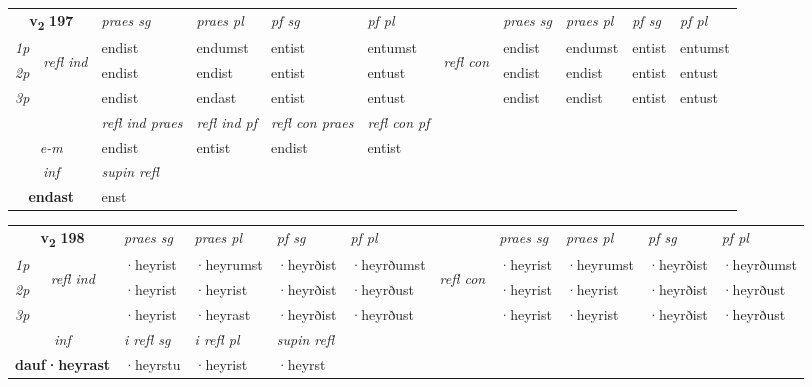 \noindent
\begin{tabular}{lllllllllll} \toprule
\multicolumn{2}{c}{\textbf{v{\textsubscript{2}}} \Large{\textbf{197}}}  &  \textit{praes sg}  & \textit{praes pl}  &\textit{ pf sg} & \textit{pf pl} &  &  \textit{praes sg}  & \textit{praes pl}  & \textit{pf sg} & \textit{pf pl } \\*
	\cmidrule{3-6} \cmidrule{8-11}
 {\textit{1p}} & \multirow{3}{*}{\begin{turn}{90}\textit{refl ind}\end{turn}}  & endist & endumst & entist & entumst & \multirow{3}{*}{\begin{turn}{90}\textit{refl con}\end{turn}}  &endist & endumst & entist & entumst \\*
 {\textit{2p}} &  & endist & endist & entist & entust & &endist & endist & entist & entust \\*
 {\textit{3p}}  & & endist & endast & entist & entust & & endist & endist& entist & entust \\*
\cmidrule{3-6} \cmidrule{8-11}

 & & \textit{refl ind praes} & \textit{refl ind pf} & \textit{refl con praes} & \textit{refl con pf} \\*
 \multicolumn{2}{c}{ \textit{e-m} }& endist & entist & endist & entist \\*

\cmidrule{3-3}
   \multicolumn{2}{c}{\textit{inf}}       & \textit{supin refl}  \\*
  \multicolumn{2}{c}{\textbf{endast}}        & enst  \\*
\end{tabular}

\noindent
\noindent
\begin{tabular}{lllllllllll} \toprule
\multicolumn{2}{c}{\textbf{v{\textsubscript{2}}} \Large{\textbf{198}}}  &  \textit{praes sg}  & \textit{praes pl}  &\textit{ pf sg} & \textit{pf pl} &  &  \textit{praes sg}  & \textit{praes pl}  & \textit{pf sg} & \textit{pf pl } \\*
	\cmidrule{3-6} \cmidrule{8-11}
 {\textit{1p}} & \multirow{3}{*}{\begin{turn}{90}\textit{refl ind}\end{turn}}  & ·heyrist & ·heyrumst & ·heyrðist & ·heyrðumst & \multirow{3}{*}{\begin{turn}{90}\textit{refl con}\end{turn}}  &·heyrist & ·heyrumst & ·heyrðist & ·heyrðumst \\*
 {\textit{2p}} &  & ·heyrist & ·heyrist & ·heyrðist & ·heyrðust & &·heyrist & ·heyrist & ·heyrðist & ·heyrðust \\*
 {\textit{3p}}  & & ·heyrist & ·heyrast & ·heyrðist & ·heyrðust & & ·heyrist & ·heyrist& ·heyrðist & ·heyrðust \\*
\cmidrule{3-6} \cmidrule{8-11}

   \multicolumn{2}{c}{\textit{inf}}   & \textit{i refl sg} & \textit{i refl pl}   & \textit{supin refl}  \\*
  \multicolumn{2}{c}{\textbf{dauf\allowbreak ·heyrast}}    & ·heyrstu & ·heyrist   & ·heyrst  \\*
\end{tabular}


